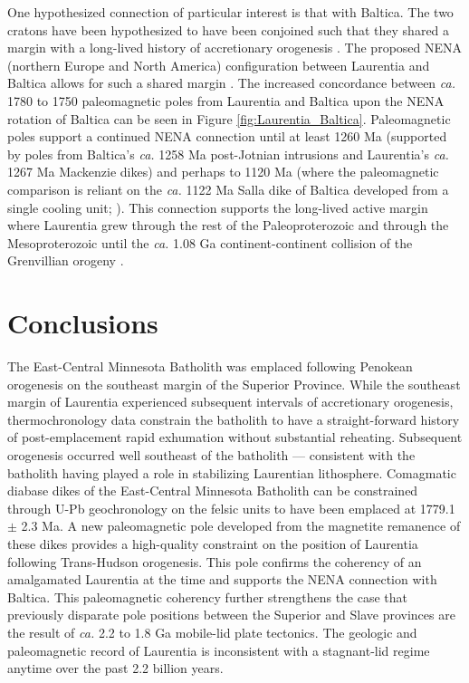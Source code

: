 \documentclass[draft]{agujournal2019}
\begin{document}
One hypothesized connection of particular interest is that with Baltica. The two cratons have been hypothesized to have been conjoined such that they shared a margin with a long-lived history of accretionary orogenesis \cite{Hoffman1997a, Karlstrom2001a}. The proposed NENA (northern Europe and North America) configuration between Laurentia and Baltica allows for such a shared margin \cite{Gower1990a, Buchan2000a, Evans2008a}. The increased concordance between \textit{ca.} 1780 to 1750 paleomagnetic poles from Laurentia and Baltica upon the NENA rotation of Baltica can be seen in Figure \ref{fig:Laurentia_Baltica}. Paleomagnetic poles support a continued NENA connection until at least 1260 Ma (supported by poles from Baltica's \textit{ca.} 1258 Ma post-Jotnian intrusions and Laurentia's \textit{ca.} 1267 Ma Mackenzie dikes) and perhaps to 1120 Ma (where the paleomagnetic comparison is reliant on the \textit{ca.} 1122 Ma Salla dike of Baltica developed from a single cooling unit; ). This connection supports the long-lived active margin where Laurentia grew through the rest of the Paleoproterozoic and through the Mesoproterozoic until the \textit{ca.} 1.08 Ga continent-continent collision of the Grenvillian orogeny \cite{Whitmeyer2007a}.

\section{Conclusions}

The East-Central Minnesota Batholith was emplaced following Penokean orogenesis on the southeast margin of the Superior Province. While the southeast margin of Laurentia experienced subsequent intervals of accretionary orogenesis, thermochronology data constrain the batholith to have a straight-forward history of post-emplacement rapid exhumation without substantial reheating. Subsequent orogenesis occurred well southeast of the batholith --- consistent with the batholith having played a role in stabilizing Laurentian lithosphere.  Comagmatic diabase dikes of the East-Central Minnesota Batholith can be constrained through U-Pb geochronology on the felsic units to have been emplaced at 1779.1 $\pm$ 2.3 Ma. A new paleomagnetic pole developed from the magnetite remanence of these dikes provides a high-quality constraint on the position of Laurentia following Trans-Hudson orogenesis. This pole confirms the coherency of an amalgamated Laurentia at the time and supports the NENA connection with Baltica. This paleomagnetic coherency further strengthens the case that previously disparate pole positions between the Superior and Slave provinces are the result of \textit{ca.} 2.2 to 1.8 Ga mobile-lid plate tectonics. The geologic and paleomagnetic record of Laurentia is inconsistent with a stagnant-lid regime anytime over the past 2.2 billion years.
\end{document}
